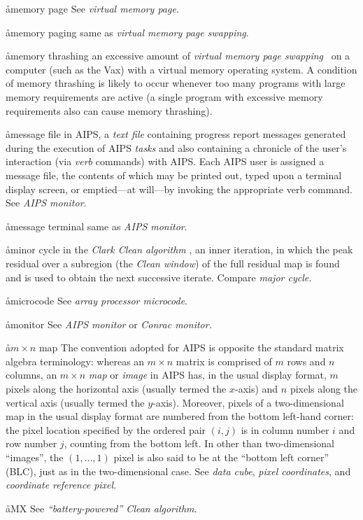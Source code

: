 \aa{memory page} See {\it virtual memory page}.

\aa{memory paging} same as {\it virtual memory page swapping}.

\aa{memory thrashing}
an excessive amount of {\it virtual memory page swapping}
\qv\ on a computer (such as the Vax) with a virtual memory operating system.
A condition of memory thrashing is likely to occur
whenever too many programs with large memory requirements are active
(a single program with excessive memory requirements
also can cause memory thrashing).

\aa{message file}
in AIPS, a {\it text file} containing progress report messages
generated during the execution of AIPS {\it tasks}
and also containing a chronicle of the user's interaction (via
{\it verb} commands) with AIPS.
Each AIPS user is assigned a message file, the contents of
which may be printed out, typed upon a terminal display screen,
or emptied---at will---by invoking the appropriate verb command.
See {\it AIPS monitor}.

\aa{message terminal}
same as {\it AIPS monitor}.

\aa{minor cycle}
in the {\it Clark Clean algorithm} \qv, an inner iteration,
in which the peak residual over a subregion (the {\it Clean
window}\/) of the full residual map is found and is used to
obtain the next successive iterate.
Compare {\it major cycle.}

\aa{microcode} See {\it array processor microcode}.

\aa{monitor} See {\it AIPS monitor} or {\it Conrac monitor.}

\aa{$m\times n$ map}
The convention adopted for AIPS is opposite the standard
matrix algebra terminology:
whereas an $m\times n$ matrix is comprised of $m$ rows
and $n$ columns, an $m\times n$ {\it map} or {\it image}
in AIPS has, in the usual display format, $m$ pixels along
the horizontal axis (usually termed the $x$-axis) and $n$
pixels along the vertical axis (usually termed the $y$-axis).
Moreover, pixels of a two-dimensional map in the usual display format
are numbered from the bottom left-hand corner:  the pixel
location specified by the ordered pair $(i,j)$ is in column number
$i$ and row number $j$, counting from the bottom left.
In other than two-dimensional ``images'', the $(1,\dots,1)$
pixel is also said to be at the ``bottom left corner'' (BLC),
just as in the two-dimensional case.
See {\it data cube}, {\it pixel coordinates}, and {\it coordinate
reference pixel}.

\aa{MX} See {\it ``\/battery-powered'' Clean algorithm}.

